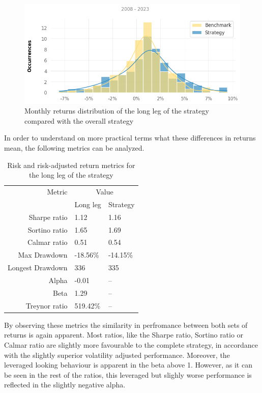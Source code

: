 \begin{figure}[ht]
    \captionsetup{justification=centering}
    \includegraphics[width=\linewidth]{assets/long-vs-strat-ret-dist.png}
    \caption{Monthly returns distribution of the long leg of the strategy compared with the overall strategy}
    \label{fig:long-vs-strat-ret-dist}
\end{figure}

In order to understand on more practical terms what these differences in returns mean, the following metrics can be analyzed.

\begin{table}[ht]
    \centering
    \begin{tabular}{rll}
        \toprule
        Metric & \multicolumn{2}{c}{Value} \\ 
        \cmidrule(lr){2-3}
            & Long leg & Strategy \\
        \midrule
        Sharpe ratio & 1.12 & 1.16 \\
        Sortino ratio & 1.65 & 1.69 \\
        Calmar ratio & 0.51 & 0.54 \\
        Max Drawdown & -18.56\% & -14.15\% \\
        Longest Drawdown & 336 & 335 \\
        Alpha & -0.01 & -- \\
        Beta & 1.29 & -- \\
        Treynor ratio & 519.42\% & -- \\
        \bottomrule
    \end{tabular}
    \caption{Risk and risk-adjusted return metrics for the long leg of the strategy}
    \label{table:risk-adjusted-long-vs-strat}
\end{table}

By observing these metrics the similarity in perfromance between both sets of returns is again apparent. Most ratios, like the Sharpe ratio, Sortino ratio or Calmar ratio are slightly more favourable to the complete strategy, in accordance with the slightly superior volatility adjusted performance. Moreover, the leveraged looking behaviour is apparent in the beta above 1. However, as it can be seen in the rest of the ratios, this leveraged but slighly worse performance is reflected in the slightly negative alpha. 

